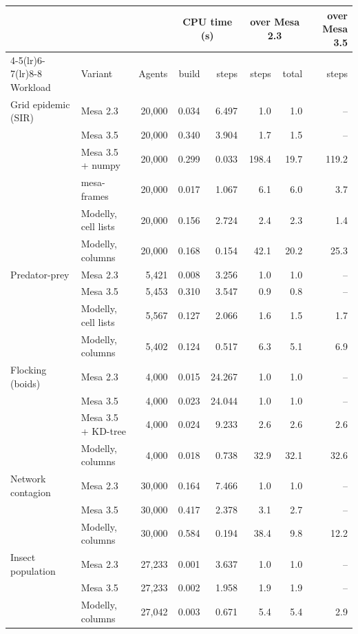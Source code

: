 \begin{tabular}{llrrrrrr}
\toprule
 & & & \multicolumn{2}{c}{CPU time (s)} & \multicolumn{2}{c}{over Mesa 2.3} & over Mesa 3.5 \\
\cmidrule(lr){4-5}\cmidrule(lr){6-7}\cmidrule(lr){8-8}
Workload & Variant & Agents & build & steps & steps & total & steps \\
\midrule
Grid epidemic (SIR) & Mesa 2.3 & 20{,}000 & 0.034 & 6.497 & 1.0 & 1.0 & -- \\
 & Mesa 3.5 & 20{,}000 & 0.340 & 3.904 & 1.7 & 1.5 & -- \\
 & Mesa 3.5 + numpy & 20{,}000 & 0.299 & 0.033 & 198.4 & 19.7 & 119.2 \\
 & mesa-frames & 20{,}000 & 0.017 & 1.067 & 6.1 & 6.0 & 3.7 \\
 & Modelly, cell lists & 20{,}000 & 0.156 & 2.724 & 2.4 & 2.3 & 1.4 \\
 & Modelly, columns & 20{,}000 & 0.168 & 0.154 & 42.1 & 20.2 & 25.3 \\
\addlinespace
Predator-prey & Mesa 2.3 & 5{,}421 & 0.008 & 3.256 & 1.0 & 1.0 & -- \\
 & Mesa 3.5 & 5{,}453 & 0.310 & 3.547 & 0.9 & 0.8 & -- \\
 & Modelly, cell lists & 5{,}567 & 0.127 & 2.066 & 1.6 & 1.5 & 1.7 \\
 & Modelly, columns & 5{,}402 & 0.124 & 0.517 & 6.3 & 5.1 & 6.9 \\
\addlinespace
Flocking (boids) & Mesa 2.3 & 4{,}000 & 0.015 & 24.267 & 1.0 & 1.0 & -- \\
 & Mesa 3.5 & 4{,}000 & 0.023 & 24.044 & 1.0 & 1.0 & -- \\
 & Mesa 3.5 + KD-tree & 4{,}000 & 0.024 & 9.233 & 2.6 & 2.6 & 2.6 \\
 & Modelly, columns & 4{,}000 & 0.018 & 0.738 & 32.9 & 32.1 & 32.6 \\
\addlinespace
Network contagion & Mesa 2.3 & 30{,}000 & 0.164 & 7.466 & 1.0 & 1.0 & -- \\
 & Mesa 3.5 & 30{,}000 & 0.417 & 2.378 & 3.1 & 2.7 & -- \\
 & Modelly, columns & 30{,}000 & 0.584 & 0.194 & 38.4 & 9.8 & 12.2 \\
\addlinespace
Insect population & Mesa 2.3 & 27{,}233 & 0.001 & 3.637 & 1.0 & 1.0 & -- \\
 & Mesa 3.5 & 27{,}233 & 0.002 & 1.958 & 1.9 & 1.9 & -- \\
 & Modelly, columns & 27{,}042 & 0.003 & 0.671 & 5.4 & 5.4 & 2.9 \\

\end{tabular}

